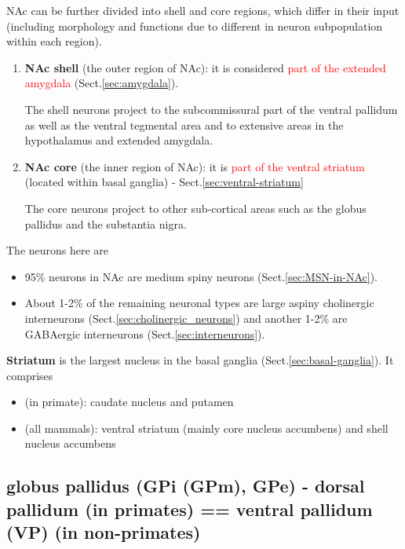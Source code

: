 NAc can be further divided into shell and core regions, which differ in their
input (including morphology and functions due to different in neuron
subpopulation within each region).
\begin{enumerate}
  \item {\bf NAc shell} (the outer region of NAc): it is considered
  \textcolor{red}{part of the extended amygdala} (Sect.\ref{sec:amygdala}). 
  
  The shell neurons project to the subcommissural part of the ventral pallidum
  as well as the ventral tegmental area and to extensive areas in the
  hypothalamus and extended amygdala.
  
  \item {\bf NAc core} (the inner region of NAc): it is \textcolor{red}{part of
  the ventral striatum} (located within basal ganglia) -
  Sect.\ref{sec:ventral-striatum}
  
  The core neurons project to other sub-cortical areas such as the globus
  pallidus and the substantia nigra.
\end{enumerate}

The neurons here are 
\begin{itemize}
  \item 95\% neurons in NAc are medium spiny neurons
(Sect.\ref{sec:MSN-in-NAc}).
   
  \item About 1-2\% of the remaining neuronal types are large aspiny cholinergic
interneurons (Sect.\ref{sec:cholinergic_neurons}) and another 1-2\% are
GABAergic interneurons (Sect.\ref{sec:interneurons}).

\end{itemize}

\begin{mdframed}
{\bf Striatum} is the largest nucleus in the basal ganglia
(Sect.\ref{sec:basal-ganglia}). It comprises \citep{gerfen1996, voorn2004}

\begin{itemize}
  \item (in primate): caudate nucleus and putamen
  \item (all mammals): ventral striatum (mainly core nucleus accumbens) and
  shell nucleus accumbens
\end{itemize}

\end{mdframed}

\subsection{globus pallidus (GPi (GPm), GPe) - dorsal pallidum (in primates) ==
ventral pallidum (VP) (in non-primates)}
\label{sec:globus_pallidus}
\label{sec:dorsal-pallidum}
\label{sec:ventral-pallidum}

